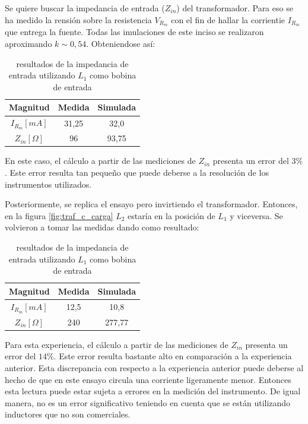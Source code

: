 Se quiere buscar la impedancia de entrada ($Z_{in}$) del transformador. Para eso se ha medido la rensión sobre la resistencia $V_{R_m}$ con el fin de hallar la corrientie $I_{R_m}$ que entrega la fuente. Todas las imulaciones de este inciso se realizaron aproximando $k \sim 0,54$. 
Obteniendose así:
\begin{table}[H]
    \centering
    \label{tab:res_carga_1}
    \begin{tabular}{|c|c|c|}
        \hline
        Magnitud & Medida & Simulada \\ \hline
        $I_{R_m}[mA]$ & 31,25  & 32,0 \\ \hline
        $Z_{in}[\Omega]$ & 96 & 93,75 \\ \hline
    \end{tabular}
    \caption{resultados de la impedancia de entrada utilizando $L_1$ como bobina de entrada}
\end{table}

En este caso, el cálculo  a partir de las mediciones de $Z_{in} $ presenta un error del $3\%$. Este error resulta tan pequeño que puede deberse a la resolución de los instrumentos utilizados. 

Posteriormente, se replica el ensayo pero invirtiendo el transformador. Entonces, en la figura \ref{fig:traf_c_carga} $L_2$ estaría en la posición de $L_1$ y viceversa. Se volvieron a tomar las medidas dando como resultado:
\begin{table}[H]
    \centering
    \label{tab:res_carga_1}
    \begin{tabular}{|c|c|c|}
        \hline
        Magnitud & Medida & Simulada \\ \hline
        $I_{R_m}[mA]$ & 12,5  & 10,8 \\ \hline
        $Z_{in}[\Omega]$ & 240 & 277,77 \\ \hline
    \end{tabular}
    \caption{resultados de la impedancia de entrada utilizando $L_1$ como bobina de entrada}
\end{table}

Para esta experiencia, el cálculo a partir de las mediciones de $Z_{in}$ presenta un error del $14\%$. Este error resulta bastante alto en comparación a la experiencia anterior. Esta discrepancia con respecto a la experiencia anterior puede deberse al hecho de que en este ensayo circula una corriente ligeramente menor. Entonces esta lectura puede estar sujeta a errores en la medición del instrumento. De igual manera, no es un error significativo teniendo en cuenta que se están utilizando inductores que no son comerciales. 

